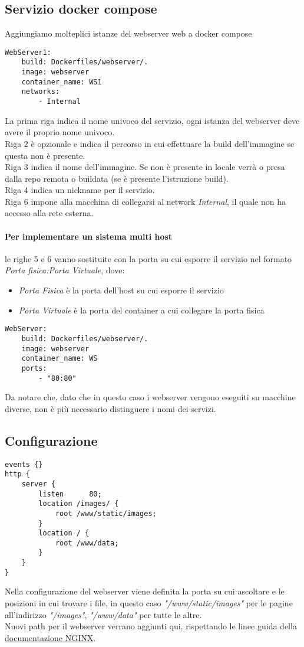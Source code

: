 \documentclass[../DocumentazioneProgetto.tex]{subfiles}
\begin{document}
	\subsection{Servizio docker compose} 
	\label{sec:WebserverDockerCompose}
	Aggiungiamo molteplici istanze del webserver web a docker compose
	\begin{lstlisting}[caption=Webserver Docker Compose] 
WebServer1:
	build: Dockerfiles/webserver/.
	image: webserver
	container_name: WS1
	networks:
		- Internal\end{lstlisting}
	La prima riga indica il nome univoco del servizio, ogni istanza del webserver deve avere il proprio nome univoco.\\
	Riga 2 è opzionale e indica il percorso in cui effettuare la build dell'immagine se questa non è presente.\\
	Riga 3 indica il nome dell'immagine. Se non è presente in locale verrà o presa dalla repo remota o buildata (se è presente l'istruzione build).\\
	Riga 4 indica un nickname per il servizio.\\
	Riga 6 impone alla macchina di collegarsi al network \textit{Internal}, il quale non ha accesso alla rete esterna. 
	\paragraph{Per implementare un sistema multi host} le righe 5 e 6 vanno sostituite con la porta su cui esporre il servizio nel formato \textit{Porta fisica:Porta Virtuale}, 
	dove:
	\begin{itemize}
		\item \textit{Porta Fisica} è la porta dell'host su cui esporre il servizio
		\item \textit{Porta Virtuale} è la porta del container a cui collegare la porta fisica 
	\end{itemize}
	\begin{lstlisting}[caption=Webserver Docker Compose in multi host] 
WebServer:
	build: Dockerfiles/webserver/.
	image: webserver
	container_name: WS
	ports:
		- "80:80"\end{lstlisting}
	Da notare che, dato che in questo caso i webserver vengono eseguiti su macchine diverse, non è più necessario distinguere i nomi dei servizi.
	\subsection{Configurazione} 
	\label{sec:WebserverConfigurazione}
	\begin{lstlisting}[caption=File di configurazione webserver NGINX] 
events {}
http {
	server {
		listen      80;
		location /images/ {
			root /www/static/images;
		}
		location / {
			root /www/data;
		}
	}
}\end{lstlisting}
	Nella configurazione del webserver viene definita la porta su cui ascoltare e le posizioni in cui trovare i file, in questo caso \textit{"/www/static/images"} per le pagine all'indirizzo \textit{"/images"}, \textit{"/www/data"} per tutte le altre.\\
	Nuovi path per il webserver verrano aggiunti qui, rispettando le linee guida della \href{https://docs.nginx.com/nginx/admin-guide/web-server/web-server/}{documentazione NGINX}.
	
\end{document}
